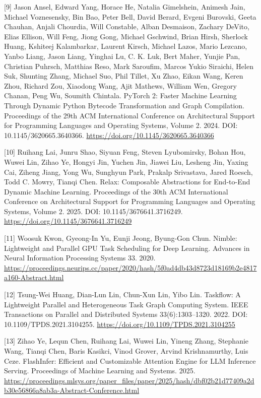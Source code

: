 \documentclass[UTF8,11pt,fontset=windows]{ctexart}
\begin{document}
\leavevmode{}%
{[}9{]} Jason Ansel, Edward Yang, Horace He, Natalia Gimelshein, Animesh Jain, Michael Voznesensky, Bin Bao, Peter Bell, David Berard, Evgeni Burovski, Geeta Chauhan, Anjali Chourdia, Will Constable, Alban Desmaison, Zachary DeVito, Elias Ellison, Will Feng, Jiong Gong, Michael Gschwind, Brian Hirsh, Sherlock Huang, Kshiteej Kalambarkar, Laurent Kirsch, Michael Lazos, Mario Lezcano, Yanbo Liang, Jason Liang, Yinghai Lu, C. K. Luk, Bert Maher, Yunjie Pan, Christian Puhrsch, Matthias Reso, Mark Saroufim, Marcos Yukio Siraichi, Helen Suk, Shunting Zhang, Michael Suo, Phil Tillet, Xu Zhao, Eikan Wang, Keren Zhou, Richard Zou, Xiaodong Wang, Ajit Mathews, William Wen, Gregory Chanan, Peng Wu, Soumith Chintala. PyTorch 2: Faster Machine Learning Through Dynamic Python Bytecode Transformation and Graph Compilation. Proceedings of the 29th ACM International Conference on Architectural Support for Programming Languages and Operating Systems, Volume 2. 2024. DOI: 10.1145/3620665.3640366. \url{https://doi.org/10.1145/3620665.3640366}

\leavevmode{}%
{[}10{]} Ruihang Lai, Junru Shao, Siyuan Feng, Steven Lyubomirsky, Bohan Hou, Wuwei Lin, Zihao Ye, Hongyi Jin, Yuchen Jin, Jiawei Liu, Lesheng Jin, Yaxing Cai, Ziheng Jiang, Yong Wu, Sunghyun Park, Prakalp Srivastava, Jared Roesch, Todd C. Mowry, Tianqi Chen. Relax: Composable Abstractions for End-to-End Dynamic Machine Learning. Proceedings of the 30th ACM International Conference on Architectural Support for Programming Languages and Operating Systems, Volume 2. 2025. DOI: 10.1145/3676641.3716249. \url{https://doi.org/10.1145/3676641.3716249}

\leavevmode{}%
{[}11{]} Woosuk Kwon, Gyeong-In Yu, Eunji Jeong, Byung-Gon Chun. Nimble: Lightweight and Parallel GPU Task Scheduling for Deep Learning. Advances in Neural Information Processing Systems 33. 2020. \url{https://proceedings.neurips.cc/paper/2020/hash/5f0ad4db43d8723d18169b2e4817a160-Abstract.html}

\leavevmode{}%
{[}12{]} Tsung-Wei Huang, Dian-Lun Lin, Chun-Xun Lin, Yibo Lin. Taskflow: A Lightweight Parallel and Heterogeneous Task Graph Computing System. IEEE Transactions on Parallel and Distributed Systems 33(6):1303--1320. 2022. DOI: 10.1109/TPDS.2021.3104255. \url{https://doi.org/10.1109/TPDS.2021.3104255}

\leavevmode{}%
{[}13{]} Zihao Ye, Lequn Chen, Ruihang Lai, Wuwei Lin, Yineng Zhang, Stephanie Wang, Tianqi Chen, Baris Kasikci, Vinod Grover, Arvind Krishnamurthy, Luis Ceze. FlashInfer: Efficient and Customizable Attention Engine for LLM Inference Serving. Proceedings of Machine Learning and Systems. 2025. \url{https://proceedings.mlsys.org/paper_files/paper/2025/hash/dbf02b21d77409a2db30e56866a8ab3a-Abstract-Conference.html}
\end{document}
